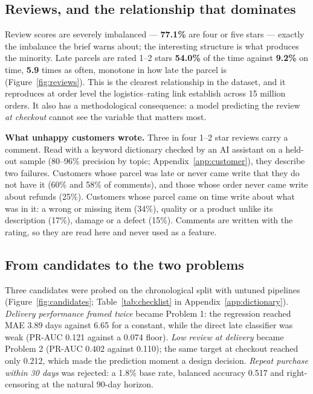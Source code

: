 \subsection{Reviews, and the relationship that dominates}
\label{sec:reviews}

Review scores are severely imbalanced --- \textbf{77.1\%} are four or five stars
--- exactly the imbalance the brief warns about; the interesting structure is
what produces the minority. Late parcels are rated 1--2 stars \textbf{54.0\%}
of the time against \textbf{9.2\%} on time, \textbf{5.9} times as often,
monotone in how late the parcel is (Figure~\ref{fig:reviews}). This is the
clearest relationship in the dataset, and it reproduces at order level the
logistics--rating link \citet{deshpande2023logistics} establish across 15
million orders. It also has a methodological consequence: a model predicting the
review \emph{at checkout} cannot see the variable that matters most.

\textbf{What unhappy customers wrote.} Three in four 1--2 star reviews carry a
comment. Read with a keyword dictionary checked by an AI assistant on a held-out
sample (80--96\% precision by topic; Appendix~\ref{app:customer}), they describe two
failures. Customers whose parcel was late or never came write that they do not
have it (60\% and 58\% of comments), and those whose order never came write
about refunds (25\%). Customers whose parcel came on time write about what was
in it: a wrong or missing item (34\%), quality or a product unlike its
description (17\%), damage or a defect (15\%). Comments are written with the
rating, so they are read here and never used as a feature.

\subsection{From candidates to the two problems}
\label{sec:candidates}

Three candidates were probed on the chronological split with
untuned pipelines (Figure~\ref{fig:candidates}; Table~\ref{tab:checklist} in
Appendix~\ref{app:dictionary}). \emph{Delivery performance framed twice} became
Problem 1: the regression reached MAE 3.89 days against 6.65 for a constant,
while the direct late classifier was weak (PR-AUC 0.121 against a 0.074 floor).
\emph{Low review at delivery} became Problem 2 (PR-AUC 0.402 against 0.110); the
same target at checkout reached only 0.212, which made the prediction moment a
design decision. \emph{Repeat purchase within 30 days} was rejected: a 1.8\%
base rate, balanced accuracy 0.517 and right-censoring at the natural 90-day
horizon.
